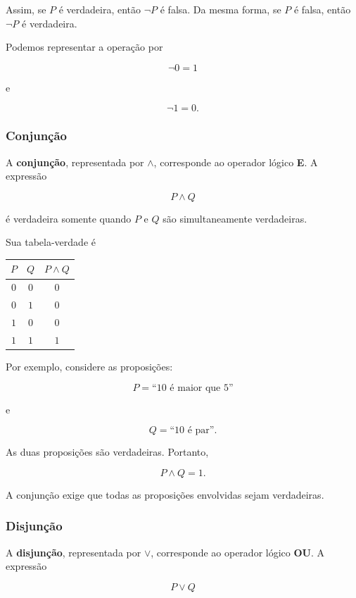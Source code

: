 \documentclass[
  brazilian,
  letterpaper,
]{book}
\theoremstyle{plain}
\theoremstyle{definition}
\theoremstyle{remark}
\begin{document}
Assim, se \(P\) é verdadeira, então \(\neg P\) é falsa. Da mesma forma,
se \(P\) é falsa, então \(\neg P\) é verdadeira.

Podemos representar a operação por

\[
\neg 0=1
\]

e

\[
\neg 1=0.
\]

\subsubsection{Conjunção}\label{conjunuxe7uxe3o}

A \textbf{conjunção}, representada por \(\wedge\), corresponde ao
operador lógico \textbf{E}. A expressão

\[
P\wedge Q
\]

é verdadeira somente quando \(P\) e \(Q\) são simultaneamente
verdadeiras.

Sua tabela-verdade é

\begin{longtable*}[]{|c|c|c|}
\toprule\noalign{}
\(P\) & \(Q\) & \(P\wedge Q\) \\
\midrule\noalign{}
\endhead
\bottomrule\noalign{}
\endlastfoot
\(0\) & \(0\) & \(0\) \\
\midrule
\(0\) & \(1\) & \(0\) \\
\midrule
\(1\) & \(0\) & \(0\) \\
\midrule
\(1\) & \(1\) & \(1\) \\
\end{longtable*}

Por exemplo, considere as proposições:

\[
P=\text{``10 é maior que 5''}
\]

e

\[
Q=\text{``10 é par''}.
\]

As duas proposições são verdadeiras. Portanto,

\[
P\wedge Q=1.
\]

A conjunção exige que todas as proposições envolvidas sejam verdadeiras.

\subsubsection{Disjunção}\label{disjunuxe7uxe3o}

A \textbf{disjunção}, representada por \(\vee\), corresponde ao operador
lógico \textbf{OU}. A expressão

\[
P\vee Q
\]
\end{document}
